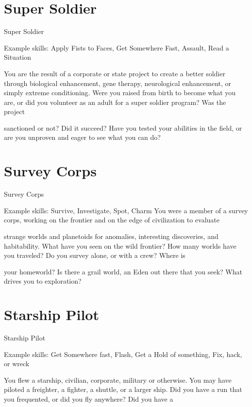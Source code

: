 \section{Super Soldier}
                                                 Super Soldier  

Example skills: Apply Fists to Faces, Get Somewhere Fast, Assault, Read a Situation  

You are the result of a corporate or state project to create a better soldier through biological enhancement,  
gene therapy, neurological enhancement, or simply extreme conditioning. Were you raised from birth to  
become what you are, or did you volunteer as an adult for a super soldier program? Was the project  

sanctioned or not? Did it succeed? Have you tested your abilities in the field, or are you unproven and  
eager to see what you can do?   

                                                                                                                      

\section{Survey Corps}
                                                 Survey Corps  

Example skills: Survive, Investigate, Spot, Charm  
You were a member of a survey corps, working on the frontier and on the edge of civilization to evaluate  

strange worlds and planetoids for anomalies, interesting discoveries, and habitability. What have you seen  
on the wild frontier? How many worlds have you traveled? Do you survey alone, or with a crew? Where is  

your homeworld? Is there a grail world, an Eden out there that you seek? What drives you to exploration?  
\section{Starship Pilot}
                                                 Starship Pilot  

Example skills: Get Somewhere fast, Flash, Get a Hold of something, Fix, hack, or wreck  

You flew a starship, civilian, corporate, military or otherwise. You may have piloted a freighter, a fighter, a  
shuttle, or a larger ship. Did you have a run that you frequented, or did you fly anywhere? Did you have a  

